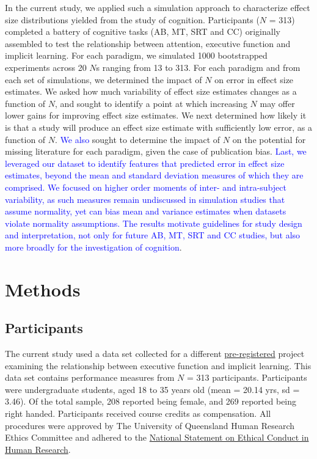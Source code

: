 \documentclass[
  man]{apa6}
\begin{document}
In the current study, we applied such a simulation approach to characterize effect size distributions yielded from the study of cognition. Participants (\(N\) = 313) completed a battery of cognitive tasks (AB, MT, SRT and CC) originally assembled to test the relationship between attention, executive function and implicit learning. For each paradigm, we simulated 1000 bootstrapped experiments across 20 \(N\)s ranging from 13 to 313. For each paradigm and from each set of simulations, we determined the impact of \(N\) on error in effect size estimates. We asked how much variability of effect size estimates changes as a function of \(N\), and sought to identify a point at which increasing \(N\) may offer lower gains for improving effect size estimates. We next determined how likely it is that a study will produce an effect size estimate with sufficiently low error, as a function of \(N\). \textcolor{blue}{We also} sought to determine the impact of \(N\) on the potential for missing literature for each paradigm, given the case of publication bias. \textcolor{blue}{Last, we leveraged our dataset to identify features that predicted error in effect size estimates, beyond the mean and standard deviation measures of which they are comprised. We focused on higher order moments of inter- and intra-subject variability, as such measures remain undiscussed in simulation studies that assume normality, yet can bias mean and variance estimates when datasets violate normality assumptions. The results motivate guidelines for study design and interpretation, not only for future AB, MT, SRT and CC studies, but also more broadly for the investigation of cognition}.

\hypertarget{methods}{%
\section{Methods}\label{methods}}

\label{sec:Method}

\hypertarget{participants}{%
\subsection{Participants}\label{participants}}

\label{sec:Participants}

The current study used a data set collected for a different \href{https://osf.io/nxysg}{pre-registered} project examining the relationship between executive function and implicit learning. This data set contains performance measures from \(N\) = 313 participants. Participants were undergraduate students, aged 18 to 35 years old (mean = 20.14 yrs, sd = 3.46). Of the total sample, 208 reported being female, and 269 reported being right handed. Participants received course credits as compensation. All procedures were approved by The University of Queensland Human Research Ethics Committee and adhered to the \href{https://www.nhmrc.gov.au/about-us/publications/national-statement-ethical-conduct-human-research-2007-updated-2018}{National Statement on Ethical Conduct in Human Research}.
\end{document}
